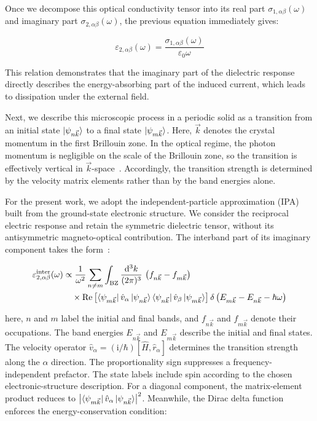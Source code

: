 Once we decompose this optical conductivity tensor into its real part $\sigma_{1,\alpha\beta}(\omega)$ and imaginary part $\sigma_{2,\alpha\beta}(\omega)$, 
the previous equation immediately gives:

\begin{equation}
    \varepsilon_{2,\alpha\beta}(\omega)
    = \frac{\sigma_{1,\alpha\beta}(\omega)}{\varepsilon_0\omega}
\label{imaginary_dielectric_from_real_conductivity}
\end{equation}

This relation demonstrates that the imaginary part of the dielectric response directly describes the energy-absorbing part of the induced current,
which leads to dissipation under the external field.

Next, we describe this microscopic process in a periodic solid as a transition from an initial state $\ket{\psi_{n\vec{k}}}$ to a final state $\ket{\psi_{m\vec{k}}}$.
Here, $\vec{k}$ denotes the crystal momentum in the first Brillouin zone.
In the optical regime, the photon momentum is negligible on the scale of the Brillouin zone,
so the transition is effectively vertical in $\vec{k}$-space~\cite{fox2010optical}.
Accordingly, the transition strength is determined by the velocity matrix elements rather than by the band energies alone.

For the present work, we adopt the independent-particle approximation (IPA)
built from the ground-state electronic structure.
We consider the reciprocal electric response and retain the symmetric dielectric tensor,
without its antisymmetric magneto-optical contribution.
The interband part of its imaginary component takes the form~\cite{d2016accurate,gajdovs2006linear}:

\begin{equation}
\begin{aligned}
    \varepsilon_{2,\alpha\beta}^{\mathrm{inter}}(\omega)
    &\propto \frac{1}{\omega^2}\sum_{n\ne m}
    \int_{\mathrm{BZ}}\frac{\mathrm{d}^3{k}}{(2\mathrm{\pi})^3}\,
    \left(f_{n\vec{k}}-f_{m\vec{k}}\right) \\
    &\quad\times\mathrm{Re}\left[
    \bra{\psi_{m\vec{k}}}\hat{v}_{\alpha}\ket{\psi_{n\vec{k}}}
    \bra{\psi_{n\vec{k}}}\hat{v}_{\beta}\ket{\psi_{m\vec{k}}}
    \right]
    \delta\left(E_{m\vec{k}}-E_{n\vec{k}}-\hbar\omega\right)
\end{aligned}
\label{independent_particle_imaginary_dielectric_tensor}
\end{equation}

here, $n$ and $m$ label the initial and final bands,
and $f_{n\vec{k}}$ and $f_{m\vec{k}}$ denote their occupations.
The band energies $E_{n\vec{k}}$ and $E_{m\vec{k}}$ describe the initial and final states.
The velocity operator $\hat{v}_{\alpha}=(\mathrm{i}/\hbar)[\hat{H},\hat{r}_{\alpha}]$ determines the transition strength along the $\alpha$ direction.
The proportionality sign suppresses a frequency-independent prefactor.
The state labels include spin according to the chosen electronic-structure description.
For a diagonal component, the matrix-element product reduces to
$\left|\bra{\psi_{m\vec{k}}}\hat{v}_{\alpha}\ket{\psi_{n\vec{k}}}\right|^2$.
Meanwhile, the Dirac delta function enforces the energy-conservation condition:

